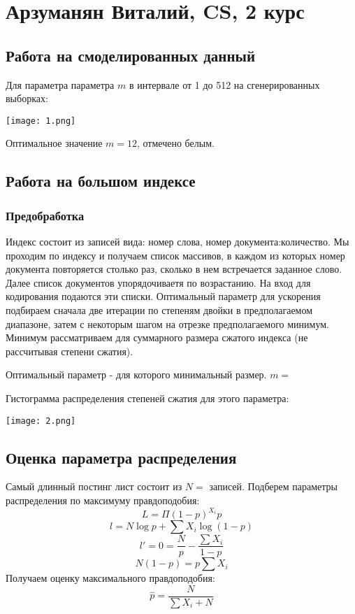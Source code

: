 \documentclass[12pt]{article}
\begin{document}
\section*{Арзуманян Виталий, CS, 2 курс}

\subsection*{Работа на смоделированных данный}
Для параметра параметра $m$ в интервале от 1 до 512 на сгенерированных выборках:

\texttt{[image: 1.png]}

Оптимальное значение $m=12$, отмечено белым.

\subsection*{Работа на большом индексе}

\subsubsection*{Предобработка}

Индекс состоит из записей вида: номер слова, номер документа:количество.
Мы проходим по индексу и получаем список массивов, в каждом из которых номер документа повторяется столько раз, сколько в нем встречается заданное слово. Далее список документов упорядочиваетя по возрастанию. На вход для кодирования подаются эти списки. Оптимальный параметр для ускорения подбираем сначала две итерации по степеням двойки в предполагаемом диапазоне, затем с некоторым шагом на отрезке предполагаемого минимум. Минимум рассматриваем для суммарного размера сжатого индекса (не рассчитывая степени сжатия).

Оптимальный параметр - для которого минимальный размер. $m = $

Гистограмма распределения степеней сжатия для этого параметра:

\texttt{[image: 2.png]}


\subsection*{Оценка параметра распределения}

Самый длинный постинг лист состоит из $N=$ записей.
Подберем параметры распределения по максимуму правдоподобия:
$$L = \Pi (1-p)^{X_i}p$$
$$l = N\log p + \sum X_i\log(1-p)$$
$$l' = 0 = \frac{N}{p} - \frac{\sum X_i}{1-p}$$
$$N(1-p) = p\sum X_i$$
Получаем оценку максимального правдоподобия:
$$\widehat{p} = \frac{N}{\sum X_i + N}$$
\end{document}
